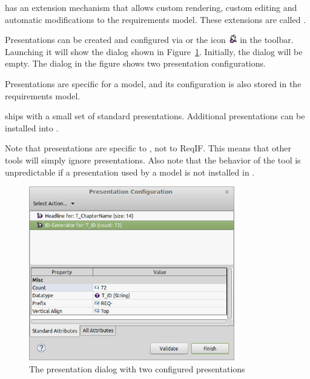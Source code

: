 % 

\pror{} has an extension mechanism that allows custom rendering, custom editing and automatic modifications to the requirements model. These extensions are called .

Presentations can be created and configured via  or the icon \includegraphics[height=1em]{../rmf-images/icons/full/obj16//ReqIFToolExtension.png} in the toolbar.  Launching it will show the dialog shown in Figure~\ref{fig:presentation-dialog}.  Initially, the dialog will be empty.  The dialog in the figure shows two presentation configurations.

Presentations are specific for a model, and its configuration is also stored in the requirements model.

\pror{} ships with a small set of standard presentations.  Additional presentations can be installed into \pror{}.

\begin{warning}
Note that presentations are specific to \pror{}, not to ReqIF.  This means that other tools will simply ignore presentations.  Also note that the behavior of the tool is unpredictable if a presentation used by a model is not installed in \pror{}.
\end{warning}

\begin{figure}
  \centering
  \includegraphics[width=0.8\textwidth]{../rmf-images/presentation-dialog.png}
  \caption{The presentation dialog with two configured presentations}
  \label{fig:presentation-dialog}
\end{figure}


